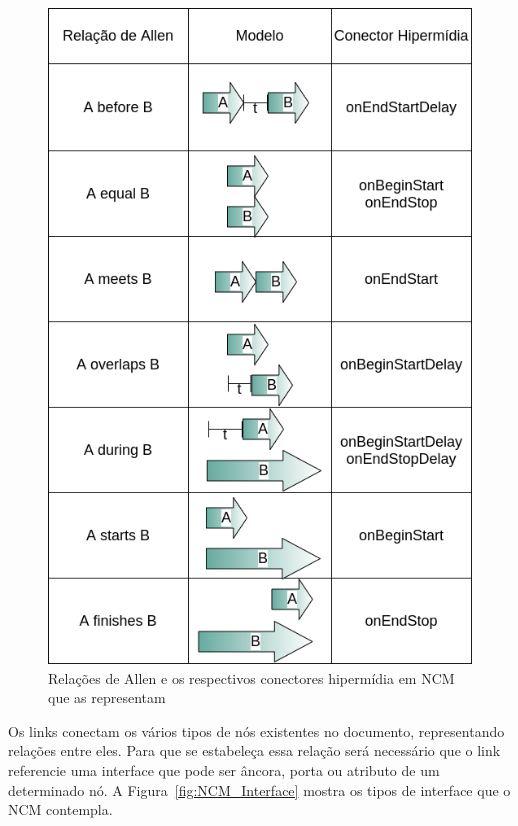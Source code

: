 \begin{figure}[!h]
    \centering
    \includegraphics[scale=0.4,keepaspectratio=true]{figuras/RelacoesdeAllen.png}
    \caption{Relações de Allen \cite{allen1990maintaining} e os respectivos conectores hipermídia em NCM que as representam}
    \label{fig:allen}
\end{figure}
      

    Os links conectam os vários tipos de nós existentes no documento, representando  relações entre eles. Para que se estabeleça essa relação será necessário que o link referencie uma interface que pode ser âncora, porta ou atributo de um determinado nó. A Figura~\ref{fig:NCM_Interface} mostra os tipos de interface que o NCM contempla.


